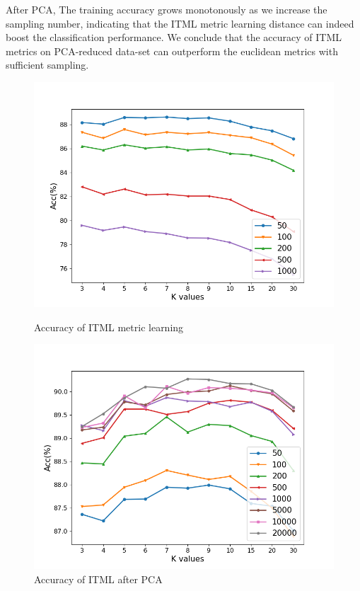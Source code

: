 After PCA, The training accuracy grows monotonously as we increase the sampling number, indicating that the ITML metric learning distance can indeed boost the classification performance. We conclude that the accuracy of ITML metrics on PCA-reduced data-set can outperform the euclidean metrics with sufficient sampling.

\begin{figure}
    \centering
    \begin{minipage}[t]{0.48\linewidth}
        \centering
        \includegraphics[width=1.0\linewidth]{img/ITML-k.png}
        \caption{Accuracy of ITML metric learning}
        \label{fig:itml}
    \end{minipage}
    \begin{minipage}[t]{0.48\linewidth}
        \centering
        \includegraphics[width=1.0\linewidth]{img/ITML-PCA-k.png}
        \caption{Accuracy of ITML after PCA}
        \label{fig:itml-pca}
    \end{minipage}
\end{figure}


